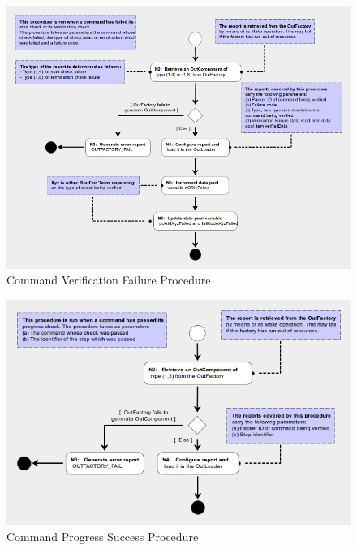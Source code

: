 \documentclass[a4paper,10pt]{article}
\begin{document}
\begin{figure}[htbp]
 \centering
 \includegraphics[scale=0.415,keepaspectratio=true]{CrPsCmdVerFail.png}
 \caption{Command Verification Failure Procedure}
 \label{fig:CmdVerFail}
\end{figure}

\begin{figure}[htbp]
 \centering
 \includegraphics[scale=0.415,keepaspectratio=true]{CrPsCmdPrgrSucc.png}
 \caption{Command Progress Success Procedure}
 \label{fig:CmdPrgrSucc}
\end{figure}
\end{document}
